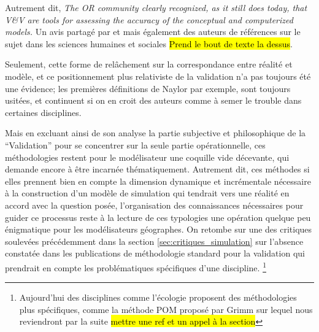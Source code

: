 Autrement dit, \textit{The OR community clearly recognized, as it still does today, that V\&V are tools for assessing the accuracy of the conceptual and computerized models.} Un avis partagé par \autocite{Kleijnen1995}  et \autocite{Sargent2010}  mais également des auteurs de références sur le sujet dans les sciences humaines et sociales \autocite{Amblard2006} \hl{Prend le bout de texte la dessus}.

Seulement, cette forme de relâchement sur la correspondance entre réalité et modèle, et ce positionnement plus relativiste de la validation n'a pas toujours été une évidence; les premières définitions de Naylor par exemple, sont toujours usitées, et continuent si on en croit des auteurs comme \textcite{Kleindorfer1998} à semer le trouble dans certaines disciplines.


Mais en excluant ainsi de son analyse la partie subjective et philosophique de la \enquote{Validation} pour se concentrer sur la seule partie opérationnelle, ces méthodologies restent pour le modélisateur une coquille vide décevante, qui demande encore à être incarnée thématiquement. Autrement dit, ces méthodes si elles prennent bien en compte la dimension dynamique et incrémentale nécessaire à la construction d'un modèle de simulation qui tendrait vers une réalité en accord avec la question posée, l'organisation des connaissances nécessaires pour guider ce processus reste à la lecture de ces typologies une opération quelque peu énigmatique pour les modélisateurs géographes. On retombe sur une des critiques soulevées précédemment dans la section \ref{sec:critiques_simulation} sur l'absence constatée dans les publications de méthodologie standard pour la validation qui prendrait en compte les problématiques spécifiques d'une discipline. \footnote{Aujourd'hui des disciplines comme l'écologie proposent des méthodologies plus spécifiques, comme la méthode POM proposé par Grimm sur lequel nous reviendront par la suite \hl{mettre une ref et un appel à la section}}

